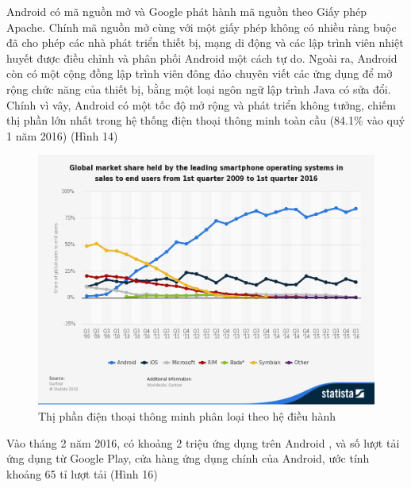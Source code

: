 \documentclass[a4paper]{article}
\begin{document}
Android có mã nguồn mở và Google phát hành mã nguồn theo Giấy phép Apache. Chính mã nguồn mở cùng với một giấy phép không có nhiều ràng buộc đã cho phép các nhà phát triển thiết bị, mạng di động và các lập trình viên nhiệt huyết được điều chỉnh và phân phối Android một cách tự do. Ngoài ra, Android còn có một cộng đồng lập trình viên đông đảo chuyên viết các ứng dụng để mở rộng chức năng của thiết bị, bằng một loại ngôn ngữ lập trình Java có sửa đổi. Chính vì vây, Android có một tốc độ mở rộng và phát triển không tưởng, chiếm thị phần lớn nhất trong hệ thống điện thoại thông minh toàn cầu (84.1\% vào quý 1 năm 2016) \cite{bib6} (Hình 14)
\begin{center}
    \begin{figure}[h]
    \begin{center}
     \includegraphics[scale=.25]{android_shipment_market.png}
    \end{center}
    \caption{Thị phần điện thoại thông minh phân loại theo hệ điều hành}
    \label{refhinh1}
    \end{figure}
\end{center}
Vào tháng 2 năm 2016, có khoảng 2 triệu ứng dụng trên Android \cite{bib7}, và số lượt tải ứng dụng từ Google Play, cửa hàng ứng dụng chính của Android, ước tính khoảng 65 tỉ lượt tải \cite{bib8} (Hình 16)
\end{document}
